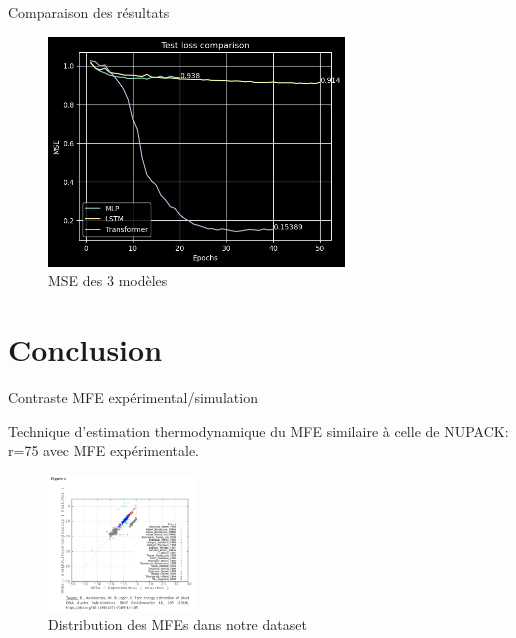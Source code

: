 \documentclass{beamer}
\begin{document}
\begin{frame}{Comparaison des résultats}
\begin{figure}
    \caption{MSE des 3 modèles} \center
    \includegraphics[width=0.7\textwidth]{images/comparaison.png}
\end{figure}
\end{frame}

\section{Conclusion}

\begin{frame}{Contraste MFE expérimental/simulation}

Technique d'estimation thermodynamique du MFE similaire à celle de NUPACK: r=75 avec MFE expérimentale.
\begin{figure} \label{fig:MFE_exp_simul}
    \caption{Distribution des MFEs dans notre dataset} \center
    \includegraphics[width=0.35\textwidth]{images/MFE_exp_simul.png}
\end{figure}

\end{frame}
\end{document}
